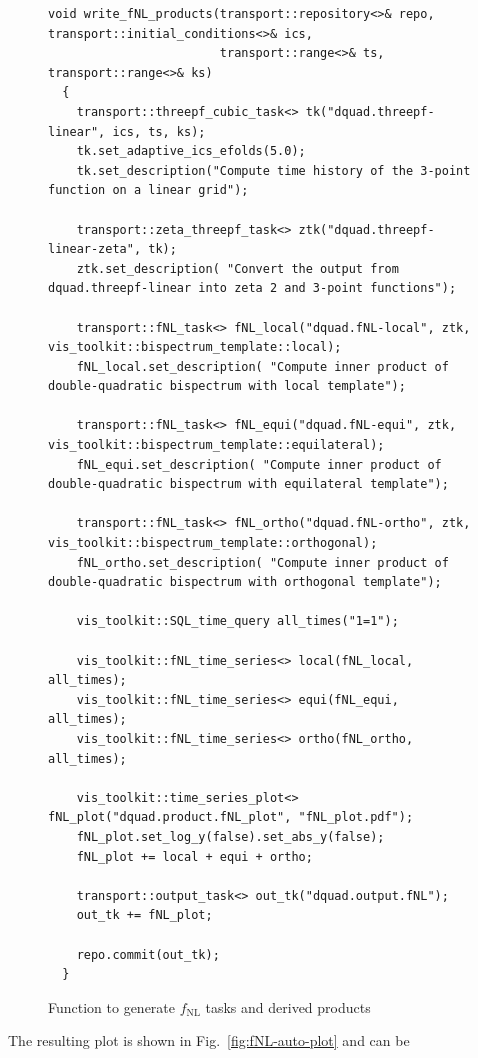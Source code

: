 \documentclass[11pt,a4paper]{article}
\newcommand{\fNL}{f_{\mathrm{NL}}}
\begin{document}
\begin{figure}
\begin{minipage}[t][15cm]{\textwidth}
\begin{verbatim}
void write_fNL_products(transport::repository<>& repo, transport::initial_conditions<>& ics,
                        transport::range<>& ts, transport::range<>& ks)
  {
    transport::threepf_cubic_task<> tk("dquad.threepf-linear", ics, ts, ks);
    tk.set_adaptive_ics_efolds(5.0);
    tk.set_description("Compute time history of the 3-point function on a linear grid");

    transport::zeta_threepf_task<> ztk("dquad.threepf-linear-zeta", tk);
    ztk.set_description( "Convert the output from dquad.threepf-linear into zeta 2 and 3-point functions");

    transport::fNL_task<> fNL_local("dquad.fNL-local", ztk, vis_toolkit::bispectrum_template::local);
    fNL_local.set_description( "Compute inner product of double-quadratic bispectrum with local template");

    transport::fNL_task<> fNL_equi("dquad.fNL-equi", ztk, vis_toolkit::bispectrum_template::equilateral);
    fNL_equi.set_description( "Compute inner product of double-quadratic bispectrum with equilateral template");

    transport::fNL_task<> fNL_ortho("dquad.fNL-ortho", ztk, vis_toolkit::bispectrum_template::orthogonal);
    fNL_ortho.set_description( "Compute inner product of double-quadratic bispectrum with orthogonal template");

    vis_toolkit::SQL_time_query all_times("1=1");

    vis_toolkit::fNL_time_series<> local(fNL_local, all_times);
    vis_toolkit::fNL_time_series<> equi(fNL_equi, all_times);
    vis_toolkit::fNL_time_series<> ortho(fNL_ortho, all_times);

    vis_toolkit::time_series_plot<> fNL_plot("dquad.product.fNL_plot", "fNL_plot.pdf");
    fNL_plot.set_log_y(false).set_abs_y(false);
    fNL_plot += local + equi + ortho;

    transport::output_task<> out_tk("dquad.output.fNL");
    out_tk += fNL_plot;

    repo.commit(out_tk);
  }
\end{verbatim}
\end{minipage}
\vspace{1cm}
\caption{\label{code:fNL-code}Function to generate $\fNL$ tasks and derived products}
\end{figure}
The resulting plot is shown in Fig.~\ref{fig:fNL-auto-plot} and can be
\end{document}
